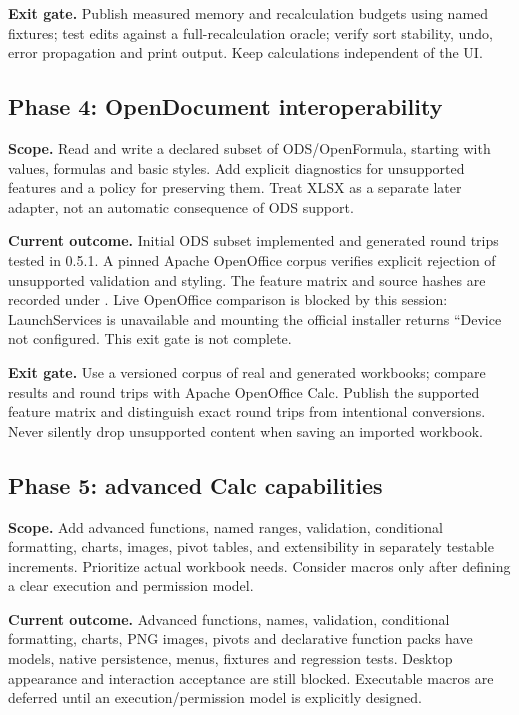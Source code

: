 \documentclass[11pt,letterpaper]{article}
\newcommand{\code}[1]{\texttt{\detokenize{#1}}}
\begin{document}
\textbf{Exit gate.} Publish measured memory and recalculation budgets using named
fixtures; test edits against a full-recalculation oracle; verify sort stability,
undo, error propagation and print output. Keep calculations independent of the UI.

\clearpage
\subsection*{Phase 4: OpenDocument interoperability}
\textbf{Scope.} Read and write a declared subset of ODS/OpenFormula, starting with
values, formulas and basic styles. Add explicit diagnostics for unsupported
features and a policy for preserving them. Treat XLSX as a separate later adapter,
not an automatic consequence of ODS support.

\textbf{Current outcome.} Initial ODS subset implemented and generated round trips
tested in 0.5.1. A pinned Apache OpenOffice corpus verifies explicit rejection
of unsupported validation and styling. The feature matrix and source hashes are
recorded under \code{lean_calc/fixtures/ods}. Live OpenOffice comparison is blocked
by this session: LaunchServices is unavailable and mounting the official installer
returns ``Device not configured. This exit gate is not complete.

\textbf{Exit gate.} Use a versioned corpus of real and generated workbooks; compare
results and round trips with Apache OpenOffice Calc. Publish the supported feature
matrix and distinguish exact round trips from intentional conversions. Never
silently drop unsupported content when saving an imported workbook.

\subsection*{Phase 5: advanced Calc capabilities}
\textbf{Scope.} Add advanced functions, named ranges, validation, conditional
formatting, charts, images, pivot tables, and extensibility in separately testable
increments. Prioritize actual workbook needs. Consider macros only after defining
a clear execution and permission model.

\textbf{Current outcome.} Advanced functions, names, validation, conditional
formatting, charts, PNG images, pivots and declarative function packs have models,
native persistence, menus, fixtures and regression tests. Desktop appearance and
interaction acceptance are still blocked. Executable macros are deferred until
an execution/permission model is explicitly designed.
\end{document}
